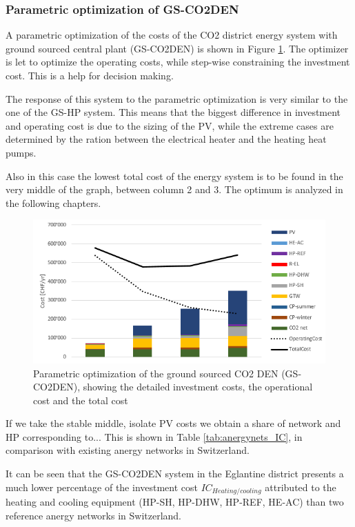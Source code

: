 \documentclass{article}
\begin{document}
\subsubsection{Parametric optimization of GS-CO2DEN}
A parametric optimization of the costs of the CO2 district energy system with ground sourced central plant (GS-CO2DEN) is shown in Figure \ref{fig:V_CO2_G_PO}. The optimizer is let to optimize the operating costs, while step-wise constraining the investment cost. This is a help for decision making.

The response of this system to the parametric optimization is very similar to the one of the GS-HP system. This means that the biggest difference in investment and operating cost is due to the sizing of the PV, while the extreme cases are determined by the ration between the electrical heater and the heating heat pumps.

Also in this case the lowest total cost of the energy system is to be found in the very middle of the graph, between column 2 and 3. The optimum is analyzed in the following chapters.

\begin{figure}[htp]
	\centering
	\includegraphics[width=1\textwidth]{V_CO2_G_PO1.png}
	\caption{Parametric optimization of the ground sourced CO2 DEN (GS-CO2DEN), showing the detailed investment costs, the operational cost and the total cost}
	\label{fig:V_CO2_G_PO}
\end{figure}

If we take the stable middle, isolate PV costs we obtain a share of network and HP corresponding to... This is shown in  Table \ref{tab:anergynets_IC}, in comparison with existing anergy networks in Switzerland.


It can be seen that the GS-CO2DEN system in the Eglantine district presents a much lower percentage of the investment cost  $IC_{Heating/cooling}$ attributed to the heating and cooling equipment (HP-SH, HP-DHW, HP-REF, HE-AC) than two reference anergy networks in Switzerland. 
\end{document}
